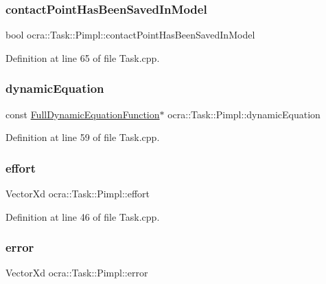 \subsubsection{\texorpdfstring{contact\+Point\+Has\+Been\+Saved\+In\+Model}{contactPointHasBeenSavedInModel}}
{\footnotesize\ttfamily bool ocra\+::\+Task\+::\+Pimpl\+::contact\+Point\+Has\+Been\+Saved\+In\+Model}



Definition at line 65 of file Task.\+cpp.

\hypertarget{structocra_1_1Task_1_1Pimpl_ae0ea7e23e7027d49ab4f7b9e4bac4e77}{}\label{structocra_1_1Task_1_1Pimpl_ae0ea7e23e7027d49ab4f7b9e4bac4e77} 
\subsubsection{\texorpdfstring{dynamic\+Equation}{dynamicEquation}}
{\footnotesize\ttfamily const \hyperlink{classocra_1_1FullDynamicEquationFunction}{Full\+Dynamic\+Equation\+Function}$\ast$ ocra\+::\+Task\+::\+Pimpl\+::dynamic\+Equation}



Definition at line 59 of file Task.\+cpp.

\hypertarget{structocra_1_1Task_1_1Pimpl_a559f2cba2b711b32d5dad8a0e7a4deed}{}\label{structocra_1_1Task_1_1Pimpl_a559f2cba2b711b32d5dad8a0e7a4deed} 
\subsubsection{\texorpdfstring{effort}{effort}}
{\footnotesize\ttfamily Vector\+Xd ocra\+::\+Task\+::\+Pimpl\+::effort}



Definition at line 46 of file Task.\+cpp.

\hypertarget{structocra_1_1Task_1_1Pimpl_a1e505b965de1375219740303422034ed}{}\label{structocra_1_1Task_1_1Pimpl_a1e505b965de1375219740303422034ed} 
\subsubsection{\texorpdfstring{error}{error}}
{\footnotesize\ttfamily Vector\+Xd ocra\+::\+Task\+::\+Pimpl\+::error}



